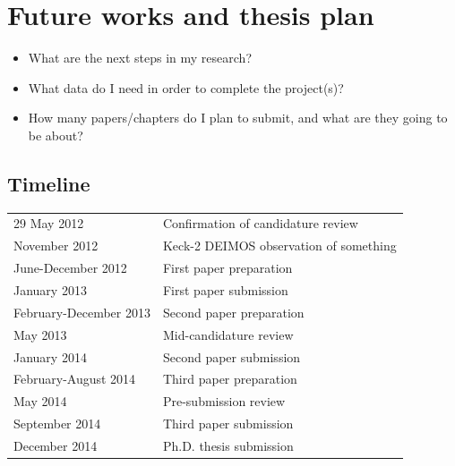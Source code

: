 \documentclass[useAMS,usenatbib,onecolumn]{mn2e}
\begin{document}
\section{Future works and thesis plan}
\label{sec:future}
\begin{itemize}
	\item{What are the next steps in my research?}
	\item{What data do I need in order to complete the project(s)?}
	\item{How many papers/chapters do I plan to submit, and what are they going to be about?}
\end{itemize}


\subsection*{Timeline}

\begin{tabular*}{0.75\textwidth}{ l l }
  29 May 2012 								& Confirmation of candidature review \\
  November 2012								& Keck-2 DEIMOS observation of something \\
  June-December 2012						& First paper preparation \\
  January 2013								& First paper submission\\
  February-December 2013					& Second paper preparation \\
  May 2013 		 							& Mid-candidature review \\
  January 2014								& Second paper submission \\
  February-August 2014		    			& Third paper preparation \\
  May 2014  								& Pre-submission review \\
  September 2014							& Third paper submission \\							 
  December 2014  							& Ph.D. thesis submission \\
\end{tabular*}

\begin{multicols}{2}
	
	{\footnotesize
	\setlength{\itemsep}{1pt}
	\begin{spacing}{0.5}
		{}
	\end{spacing}	}
\end{multicols}
\end{document}
